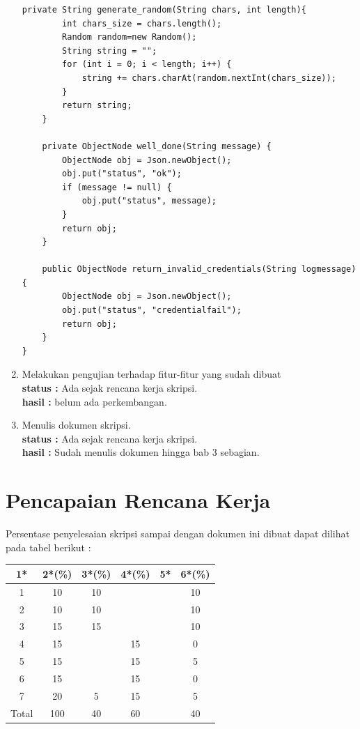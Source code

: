 \documentclass[a4paper,twoside]{article}
\begin{document}
\begin{enumerate}
\begin{lstlisting}[caption=Application.java,label={lst:aplication.java}]
    private String generate_random(String chars, int length){
        int chars_size = chars.length();
        Random random=new Random();
        String string = "";
        for (int i = 0; i < length; i++) {
            string += chars.charAt(random.nextInt(chars_size));
        }
        return string;
    }

    private ObjectNode well_done(String message) {
        ObjectNode obj = Json.newObject();
        obj.put("status", "ok");
        if (message != null) {
            obj.put("status", message);
        }
        return obj;
    }

    public ObjectNode return_invalid_credentials(String logmessage) {
        ObjectNode obj = Json.newObject();
        obj.put("status", "credentialfail");
        return obj;
    }
}
\end{lstlisting}

		
		\item Melakukan pengujian terhadap fitur-fitur yang sudah dibuat\\
		{\bf status :} Ada sejak rencana kerja skripsi.\\
		{\bf hasil :} belum ada perkembangan.

		\item Menulis dokumen skripsi.\\
		{\bf status :} Ada sejak rencana kerja skripsi.\\
		{\bf hasil :} Sudah menulis dokumen hingga bab 3 sebagian.
	\end{enumerate}




\section{Pencapaian Rencana Kerja}
Persentase penyelesaian skripsi sampai dengan dokumen ini dibuat dapat dilihat pada tabel berikut :

\begin{center}
  \begin{tabular}{ | c | c | c | c | l | c |}
    \hline
    1*  & 2*(\%) & 3*(\%) & 4*(\%) &5* &6*(\%)\\ \hline \hline
    1   & 10 & 10 &    &  & 10 \\ \hline
    2   & 10 & 10 &    &  & 10 \\ \hline
    3   & 15 & 15 &    &  & 10 \\ \hline
    4   & 15 &    & 15 &  & 0 \\ \hline
    5   & 15 &    & 15 &  & 5 \\ \hline
    6   & 15 &    & 15 &  & 0 \\ \hline
    7   & 20 & 5  & 15 &  & 5 \\ \hline
    Total  & 100  & 40  & 60 &  & 40\\ \hline
                          \end{tabular}
\end{center}
\end{document}

